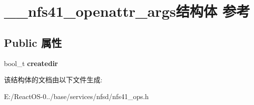 \hypertarget{struct____nfs41__openattr__args}{}\section{\+\_\+\+\_\+nfs41\+\_\+openattr\+\_\+args结构体 参考}
\label{struct____nfs41__openattr__args}
\subsection*{Public 属性}
\begin{DoxyCompactItemize}
\item 
\mbox{\label{struct____nfs41__openattr__args_a0fbdaeaa288e2d7bd6cd524682434108}} 
bool\+\_\+t {\bfseries createdir}
\end{DoxyCompactItemize}


该结构体的文档由以下文件生成\+:\begin{DoxyCompactItemize}
\item 
E\+:/\+React\+O\+S-\/0../base/services/nfsd/nfs41\+\_\+ops.\+h\end{DoxyCompactItemize}
